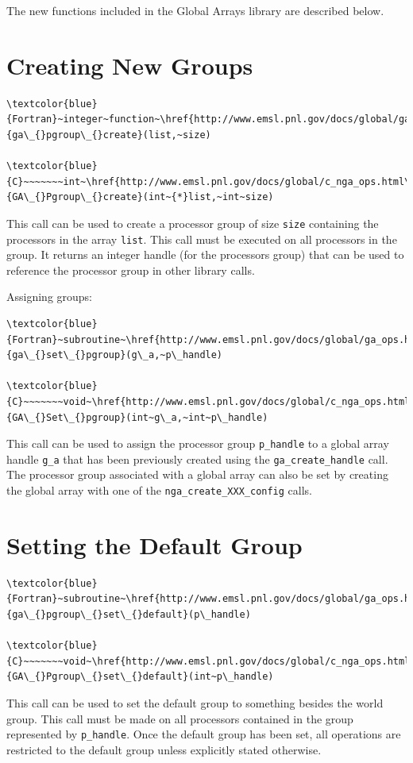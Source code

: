 The new functions included in the Global Arrays library are described
below. 


\section{Creating New Groups}
\begin{verbatim}
\textcolor{blue}{Fortran}~integer~function~\href{http://www.emsl.pnl.gov/docs/global/ga_ops.html\#GA_PGROUP_CREATE}{ga\_{}pgroup\_{}create}(list,~size)

\textcolor{blue}{C}~~~~~~~int~\href{http://www.emsl.pnl.gov/docs/global/c_nga_ops.html\#GA_PGROUP_CREATE}{GA\_{}Pgroup\_{}create}(int~{*}list,~int~size)
\end{verbatim}
This call can be used to create a processor group of size \texttt{size}
containing the processors in the array \texttt{list}. This call must
be executed on all processors in the group. It returns an integer
handle (for the processors group) that can be used to reference the
processor group in other library calls.

Assigning groups:
\begin{verbatim}
\textcolor{blue}{Fortran}~subroutine~\href{http://www.emsl.pnl.gov/docs/global/ga_ops.html\#GA_SET_PGROUP}{ga\_{}set\_{}pgroup}(g\_a,~p\_handle)

\textcolor{blue}{C}~~~~~~~void~\href{http://www.emsl.pnl.gov/docs/global/c_nga_ops.html\#GA_SET_PGROUP}{GA\_{}Set\_{}pgroup}(int~g\_a,~int~p\_handle)
\end{verbatim}
This call can be used to assign the processor group \texttt{p\_handle}
to a global array handle \texttt{g\_a} that has been previously created
using the \texttt{ga\_create\_handle} call. The processor group associated
with a global array can also be set by creating the global array with
one of the \texttt{nga\_create\_XXX\_config} calls. 


\section{Setting the Default Group}
\begin{verbatim}
\textcolor{blue}{Fortran}~subroutine~\href{http://www.emsl.pnl.gov/docs/global/ga_ops.html\#GA_PGROUP_SET_DEFAULT}{ga\_{}pgroup\_{}set\_{}default}(p\_handle)

\textcolor{blue}{C}~~~~~~~void~\href{http://www.emsl.pnl.gov/docs/global/c_nga_ops.html\#GA_PGROUP_SET_DEFAULT}{GA\_{}Pgroup\_{}set\_{}default}(int~p\_handle)
\end{verbatim}
This call can be used to set the default group to something besides
the world group. This call must be made on all processors contained
in the group represented by \texttt{p\_handle}. Once the default group
has been set, all operations are restricted to the default group unless
explicitly stated otherwise. 


